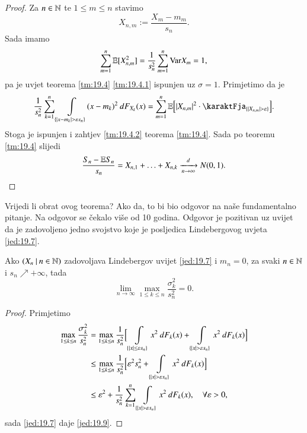 \begin{proof}
    Za $n \in \mathbb{N}$ te $1 \leq m \leq n$ stavimo
    \begin{equation*}
        X_{n, m} := \frac{X_m - m_m}{s_n}.
    \end{equation*}
    Sada imamo
    \begin{equation*}
        \sum\limits_{m = 1}^{n} \mathbb{E} [X_{n, m}^2] = \frac{1}{s_n^2} \sum\limits_{m = 1}^{n} \mathrm{Var} X_m = 1,
    \end{equation*}
    pa je uvjet teorema \ref{tm:19.4} \ref{tm:19.4.1} ispunjen uz $\sigma = 1$.
    Primjetimo da je
    \begin{equation*}
        \frac{1}{s_n^2} \suma{k = 1}{n} \int\limits_{\{|x - m_k| > \varepsilon s_n\}} (x - m_k)^2 \: d F_{X_k} (x) = \suma{m = 1}{n} \masE \Big[ |X_{n, m}|^2 \cdot \karaktFja_{\{ |X_{n, m}| > \varepsilon \}} \Big].
    \end{equation*}
    Stoga je ispunjen i zahtjev \ref{tm:19.4.2} teorema \ref{tm:19.4}.
    Sada po teoremu \ref{tm:19.4} slijedi
    \begin{equation*}
        \frac{S_n - \mathbb{E} S_n}{s_n} = X_{n, 1} + \ldots + X_{n, k} \xrightarrow[n \to \infty]{d} N(0, 1).
    \end{equation*}
\end{proof}

Vrijedi li obrat ovog teorema?
Ako da, to bi bio odgovor na na\v se fundamentalno pitanje.
Na odgovor se \v cekalo vi\v se od 10 godina.
Odgovor je pozitivan uz uvijet da je zadovoljeno jedno svojstvo koje je posljedica Lindebergovog uvjeta \eqref{jed:19.7}.

\begin{lm}  \label{lm:19.8}
    Ako $({X_n} \: | \: {n \in \mathbb{N}})$ zadovoljava Lindebergov uvijet \eqref{jed:19.7} i $m_n = 0$, za svaki $n \in \mathbb{N}$ i $s_n \nearrow +\infty$, tada
    \begin{equation}    \label{jed:19.9}
        \lim\limits_{n \to \infty} \max\limits_{1 \leq k \leq n} \frac{\sigma_k^2}{s_n^2} = 0.
    \end{equation}
\end{lm}

\begin{proof}
    Primjetimo
    \begin{equation*}
        \begin{aligned}
            \max\limits_{1 \leq k \leq n} \frac{\sigma_k^2}{s_n^2} &= \max\limits_{1 \leq k \leq n} \frac{1}{s_n^2} \Big[ \int\limits_{\{ |x|\leq \varepsilon s_n \}} x^2 \: d F_k (x) + \int\limits_{\{ |x| > \varepsilon s_n \}} x^2 \: d F_k (x) \Big]\\
            &\leq \max\limits_{1 \leq k \leq n} \frac{1}{s_n^2} \Big[ \varepsilon^2 s_n^2 + \int\limits_{\{ |x| > \varepsilon s_n \}} x^2 \: d F_k (x) \Big]\\
            &\leq \varepsilon^2 + \frac{1}{s_n^2} \sum\limits_{k = 1}^{n} \int\limits_{\{ |x| > \varepsilon s_n \}} x^2 \: d F_k (x), \quad \forall \varepsilon > 0,
        \end{aligned}
    \end{equation*}
    sada \eqref{jed:19.7} daje \eqref{jed:19.9}.
\end{proof}

